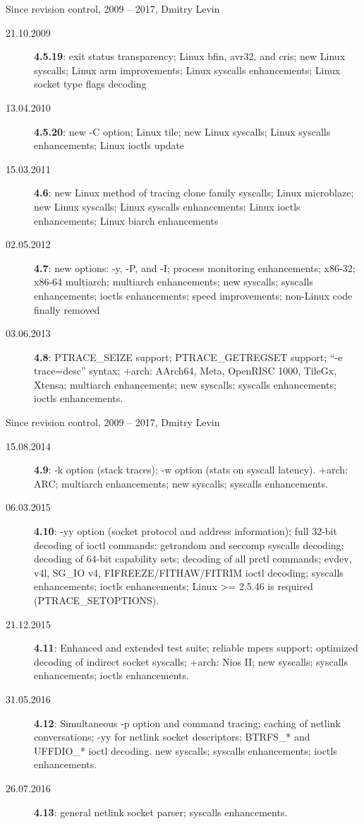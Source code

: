 \documentclass[unicode,aspectratio=169]{beamer}
\begin{document}
\begin{frame}{Since revision control, 2009 -- 2017, Dmitry Levin}
	\begin{description}
		\item[21.10.2009] {\bf 4.5.19}:
			exit status transparency;
			Linux bfin, avr32, and cris;
			new Linux syscalls;
			Linux arm improvements;
			Linux syscalls enhancements;
			Linux socket type flags decoding
		\item[13.04.2010] {\bf 4.5.20}:
			new -C option;
			Linux tile;
			new Linux syscalls;
			Linux syscalls enhancements;
			Linux ioctls update
		\item[15.03.2011] {\bf 4.6}:
			new Linux method of tracing clone family syscalls;
			Linux microblaze;
			new Linux syscalls;
			Linux syscalls enhancements;
			Linux ioctls enhancements;
			Linux biarch enhancements
		\item[02.05.2012] {\bf 4.7}:
			new options: -y, -P, and -I;
			process monitoring enhancements;
			x86-32; x86-64 multiarch;
			multiarch enhancements;
			new syscalls;
			syscalls enhancements;
			ioctls enhancements;
			speed improvements;
			non-Linux code finally removed
		\item[03.06.2013] {\bf 4.8}:
			PTRACE\_SEIZE support;
			PTRACE\_GETREGSET support;
			``-e trace=desc'' syntax;
			+arch: AArch64, Meta, OpenRISC 1000, TileGx, Xtensa;
			multiarch enhancements;
			new syscalls;
			syscalls enhancements;
			ioctls enhancements.
	\end{description}
\end{frame}

\begin{frame}{Since revision control, 2009 -- 2017, Dmitry Levin}
	\begin{description}
		\item[15.08.2014] {\bf 4.9}:
			-k option (stack traces);
			-w option (stats on syscall latency).
			+arch: ARC;
			multiarch enhancements;
			new syscalls;
			syscalls enhancements.
		\item[06.03.2015] {\bf 4.10}:
			-yy option (socket protocol and address information);
			full 32-bit decoding of ioctl commands;
			getrandom and seccomp syscalls decoding;
			decoding of 64-bit capability sets;
			decoding of all prctl commands;
			evdev, v4l, SG\_IO v4, FIFREEZE/FITHAW/FITRIM ioctl decoding;
			syscalls enhancements;
			ioctls enhancements;
			Linux >= 2.5.46 is required (PTRACE\_SETOPTIONS).
		\item[21.12.2015] {\bf 4.11}:
			Enhanced and extended test suite;
			reliable mpers support;
			optimized decoding of indirect socket syscalls;
			+arch: Nios II;
			new syscalls;
			syscalls enhancements;
			ioctls enhancements.
		\item[31.05.2016] {\bf 4.12}:
			Simultaneous -p option and command tracing;
			caching of netlink conversations;
			-yy for netlink socket descriptors;
			BTRFS\_* and UFFDIO\_* ioctl decoding.
			new syscalls;
			syscalls enhancements;
			ioctls enhancements.
		\item[26.07.2016] {\bf 4.13}:
			general netlink socket parser;
			syscalls enhancements.
	\end{description}
\end{frame}
\end{document}
